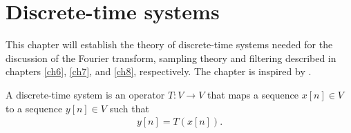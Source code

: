 \chapter{Discrete-time systems}\label{discrete_time_systems} \label{ch4}
 This chapter will establish the theory of discrete-time systems needed for the discussion of the Fourier transform, sampling theory and filtering described in chapters \ref{ch6}, \ref{ch7}, and \ref{ch8}, respectively. The chapter is inspired by \cite{pages 195-198, FSP}.
\begin{definition}\label{def:discrete_time_system}
A discrete-time system is an operator $T: V \to V$ that maps a sequence $x[n]\in V$ to a sequence $y[n]\in V$ such that
\begin{align}\label{eq:DTS}
y[n]=T(x[n]).
\end{align}
\end{definition}

